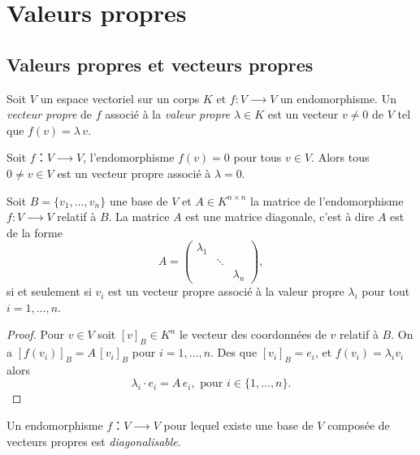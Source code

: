 \chapter{Valeurs propres}
\label{cha:valeurs-propres-et}


\section{Valeurs propres et vecteurs propres}
\label{sec:valeurs-propres-et}

\begin{definition}
  \label{def:16}
  Soit $V$ un espace vectoriel sur un corps $K$ et $f \colon V ⟶V$ un endomorphisme. Un \emph{vecteur propre} de $f$  associé à la \emph{valeur propre} $λ ∈K$ est un vecteur $v ≠ 0$ de $V$ tel que $f(v) = λ\,v$.
\end{definition}

\begin{example}
  \label{exe:23}
  Soit $f：V⟶V$, l'endomorphisme $f(v) = 0$ pour tous $v ∈V$. Alors tous $0≠v ∈V$ est un vecteur propre associé à $λ=0$. 
\end{example}


\begin{lemma}
  \label{lem:4}
  Soit $B = \{v_1,\dots,v_n\}$ une base de $V$ et $A ∈ K^{n×n}$ la matrice de l'endomorphisme $f : V ⟶V$ relatif à $B$. La matrice $A$ est une matrice diagonale, c'est à dire $A$ est de la forme
  \begin{displaymath}
    A =
    \begin{pmatrix}
      λ_1  \\
         & \ddots \\
         & & λ_n
    \end{pmatrix},
  \end{displaymath}
si et seulement si $v_i$ est un vecteur propre associé à la valeur propre $λ_i$ pour tout $i=1,\dots,n$.
\end{lemma}

\begin{proof}
    Pour $v ∈V$ soit $[v]_B ∈K^n$ le vecteur des coordonnées de $v$ relatif à $B$. On a $[f(v_i)]_B = A \,  [v_i]_B$ pour $i=1,\dots,n$. Des que $[v_i]_B = e_i$, et $f(v_i) = λ_i v_i$ alors
    \begin{displaymath}
      λ_i ⋅ e_i = A \, e_i, \text{ pour } i ∈\{1,\dots,n\}.
    \end{displaymath}
\end{proof}


\begin{definition}
  \label{def:39}
  Un endomorphisme $f ：V ⟶ V$ pour lequel existe une base de $V$ composée de vecteurs propres est \emph{diagonalisable}. 
\end{definition}


